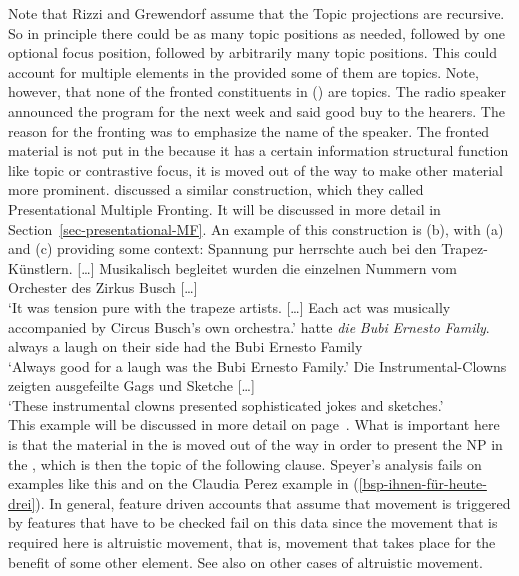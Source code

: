 \noindent
Note that Rizzi and Grewendorf assume that the
Topic projections are recursive. So in principle there could be as many topic positions as needed,
followed by one optional focus position, followed by arbitrarily many topic positions. This could
account for multiple elements in the \vf provided some of them are topics. Note, however, that none
of the fronted constituents in () are topics. The radio speaker announced the program for the
next week and said good buy to the hearers. The reason for the fronting was to emphasize the name of
the speaker. The fronted material is not put in the \vf because it has a certain information
structural function like topic or contrastive focus, it is moved out of the way to make other material more
prominent. \citet{BC2010a} discussed a similar construction, which they called Presentational Multiple Fronting. It
will be discussed in more detail in Section~\ref{sec-presentational-MF}. An example of this
construction is (b), with (a) and (c) providing some context:
\eal
\ex Spannung pur herrschte auch bei den Trapez-Künstlern. [\ldots]  Musika\-lisch begleitet wurden die einzelnen Nummern vom Orchester des Zir\-kus Busch [\ldots]\\
    `It was tension pure with the trapeze artists. [\ldots] Each act was musically accompanied by Circus Busch's own orchestra.'
\ex
{} hatte \textit{die} \textit{Bubi} \textit{Ernesto} \textit{Family}.\\
 \hspaceThis{[}always  \hspaceThis{[}a laugh  \hspaceThis{[}on their side had the Bubi Ernesto Family\\
\glt `Always good for a laugh was the Bubi Ernesto Family.'
\ex Die Instrumental-Clowns zeigten ausgefeilte Gags und Sketche [\ldots]\\
    `These instrumental clowns presented sophisticated jokes and sketches.'\\ 
\zl
This example will be discussed in more detail on page~\pageref{pres}. What is important here is that
the material in the \vf is moved out of the way in order to present the NP in the \mf, which is then
the topic of the following clause. Speyer's analysis fails on examples like this and on the
Claudia Perez example in (\ref{bsp-ihnen-für-heute-drei}). In general, feature driven accounts that
assume that movement is triggered by features that have to be checked \citep{Chomsky95a-u}
fail on this data since the movement that is required here is altruistic movement, that is, movement
that takes place for the benefit of some other element. See also \citet{Fanselow2003b} on other
cases of altruistic movement.


